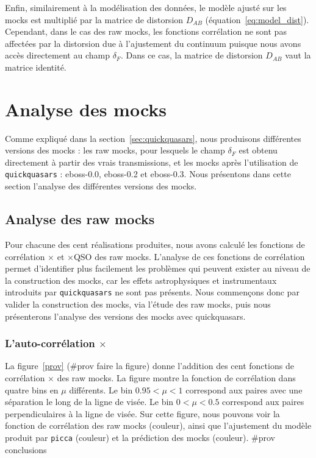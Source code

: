 \documentclass[11pt, twoside, a4paper, openright]{report}
\begin{document}
Enfin, similairement à la modélisation des données, le modèle ajusté sur les mocks est multiplié par la matrice de distorsion $D_{AB}$ (équation~\ref{eq:model_dist}). Cependant, dans le cas des raw mocks, les fonctions corrélation ne sont pas affectées par la distorsion due à l'ajustement du continuum puisque nous avons accès directement au champ $\delta_F$. Dans ce cas, la matrice de distorsion $D_{AB}$ vaut la matrice identité.


\section{Analyse des mocks}
Comme expliqué dans la section~\ref{sec:quickquasars}, nous produisons différentes versions des mocks : les raw mocks, pour lesquels le champ $\delta_F$ est obtenu directement à partir des vrais transmissions, et les mocks après l'utilisation de \texttt{quickquasars} : eboss-0.0, eboss-0.2 et eboss-0.3.
Nous présentons dans cette section l'analyse des différentes versions des mocks.


\subsection{Analyse des raw mocks}
Pour chacune des cent réalisations produites, nous avons calculé les fonctions de corrélation \lya{}$\times$\lya{} et \lya{}$\times$QSO des raw mocks.
L'analyse de ces fonctions de corrélation permet d'identifier plus facilement les problèmes qui peuvent exister au niveau de la construction des mocks, car les effets astrophysiques et instrumentaux introduits par \texttt{quickquasars} ne sont pas présents. Nous commençons donc par valider la construction des mocks, via l'étude des raw mocks, puis nous présenterons l'analyse des versions des mocks avec quickquasars.

\subsubsection{L'auto-corrélation \lya{}$\times$\lya{}}
La figure~\ref{prov} (\#prov faire la figure) donne l'addition des cent fonctions de corrélation \lya{}$\times$\lya{} des raw mocks.
La figure montre la fonction de corrélation dans quatre bins en $\mu$ différents. Le bin $\num{0.95} < \mu < 1$ correspond aux paires avec une séparation le long de la ligne de visée. Le bin $\num{0} < \mu < \num{0.5}$ correspond aux paires perpendiculaires à la ligne de visée.
Sur cette figure, nous pouvons voir la fonction de corrélation des raw mocks (couleur), ainsi que l'ajustement du modèle produit par \texttt{picca} (couleur) et la prédiction des mocks (couleur).
\#prov  conclusions
\end{document}
